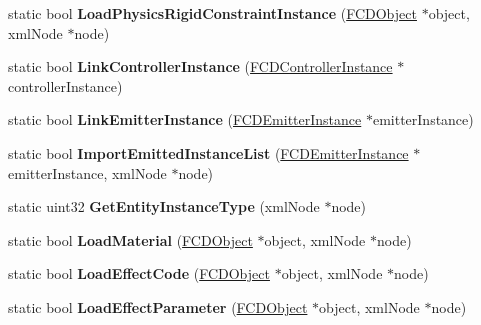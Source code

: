 \begin{DoxyCompactItemize}
\item 
\hypertarget{classFArchiveXML_a23d938ee0bf9e6a2b017646b639fee68}{
static bool {\bfseries LoadPhysicsRigidConstraintInstance} (\hyperlink{classFCDObject}{FCDObject} $\ast$object, xmlNode $\ast$node)}
\label{classFArchiveXML_a23d938ee0bf9e6a2b017646b639fee68}

\item 
\hypertarget{classFArchiveXML_aa02dcab5cfd175401750a05d992e1d2b}{
static bool {\bfseries LinkControllerInstance} (\hyperlink{classFCDControllerInstance}{FCDControllerInstance} $\ast$controllerInstance)}
\label{classFArchiveXML_aa02dcab5cfd175401750a05d992e1d2b}

\item 
\hypertarget{classFArchiveXML_a1c77296a350a216bafcd5275447d58fd}{
static bool {\bfseries LinkEmitterInstance} (\hyperlink{classFCDEmitterInstance}{FCDEmitterInstance} $\ast$emitterInstance)}
\label{classFArchiveXML_a1c77296a350a216bafcd5275447d58fd}

\item 
\hypertarget{classFArchiveXML_aa8f1c68e99ccbe83af81a014d7b81fb3}{
static bool {\bfseries ImportEmittedInstanceList} (\hyperlink{classFCDEmitterInstance}{FCDEmitterInstance} $\ast$emitterInstance, xmlNode $\ast$node)}
\label{classFArchiveXML_aa8f1c68e99ccbe83af81a014d7b81fb3}

\item 
\hypertarget{classFArchiveXML_a55429934b31d562678dbe3b6750785b7}{
static uint32 {\bfseries GetEntityInstanceType} (xmlNode $\ast$node)}
\label{classFArchiveXML_a55429934b31d562678dbe3b6750785b7}

\item 
\hypertarget{classFArchiveXML_a78515848c51397e3eb41b95a97eea267}{
static bool {\bfseries LoadMaterial} (\hyperlink{classFCDObject}{FCDObject} $\ast$object, xmlNode $\ast$node)}
\label{classFArchiveXML_a78515848c51397e3eb41b95a97eea267}

\item 
\hypertarget{classFArchiveXML_a24d260139664a8ebfd6c03867ac8fef1}{
static bool {\bfseries LoadEffectCode} (\hyperlink{classFCDObject}{FCDObject} $\ast$object, xmlNode $\ast$node)}
\label{classFArchiveXML_a24d260139664a8ebfd6c03867ac8fef1}

\item 
\hypertarget{classFArchiveXML_a6efa928ba5a0471fc33f9b7623ace940}{
static bool {\bfseries LoadEffectParameter} (\hyperlink{classFCDObject}{FCDObject} $\ast$object, xmlNode $\ast$node)}
\label{classFArchiveXML_a6efa928ba5a0471fc33f9b7623ace940}


\end{DoxyCompactItemize}
